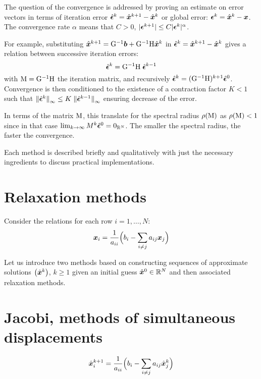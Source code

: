 \medskip
The question of the convergence is addressed by proving an estimate on error vectors in terms of iteration error $\hat{{\boldsymbol \epsilon}}^k = \hat{\boldsymbol x}^{k+1}-\hat{\boldsymbol x}^{k}$ or global error: ${\boldsymbol \epsilon}^k = \hat{\boldsymbol x}^{k}-{\boldsymbol x}$. The convergence rate $\alpha$ means that $C > 0$, $\lvert{\boldsymbol \epsilon}^{k+1}\rvert \leq C \lvert{\boldsymbol \epsilon}^{k}\rvert^\alpha$.

\medskip
For example, substituting $\hat{\boldsymbol x}^{k+1} = {\mathrm G}^{-1}{\boldsymbol b} + {\mathrm G}^{-1}{\mathrm H} \hat{\boldsymbol x}^{k}$ in $\hat{{\boldsymbol \epsilon}}^k = \hat{\boldsymbol x}^{k+1}-\hat{\boldsymbol x}^{k}$ gives a relation between successive iteration errors:
\[
\hat{{\boldsymbol \epsilon}}^{k} = {\mathrm G}^{-1}{\mathrm H}\;\hat{{\boldsymbol \epsilon}}^{k-1}
\]
with ${\mathrm M} = {\mathrm G}^{-1}{\mathrm H}$ the iteration matrix, and recursively $\hat{{\boldsymbol \epsilon}}^{k} = ({\mathrm G}^{-1}{\mathrm H})^{k+1}\hat{{\boldsymbol \epsilon}}^{0}$.
Convergence is then conditioned to the existence of a contraction factor $K < 1$ such that ${\lVert \hat{{\boldsymbol \epsilon}}^{k} \rVert}_{\infty} \leq K\;{\lVert \hat{{\boldsymbol \epsilon}}^{k-1} \rVert}_{\infty}$ ensuring decrease of the error.

\medskip
In terms of the matrix ${\mathrm M}$, this translate for the spectral radius $\rho({\mathrm M})$ as $\rho({\mathrm M}) < 1$ since in that case $\lim_{k\rightarrow\infty} M^k \hat{{\boldsymbol \epsilon}}^{0} = 0_{{\mathbb{R}^N}}$.
The smaller the spectral radius, the faster the convergence.

\medskip
Each method is described briefly and qualitatively with just the necessary ingredients to discuss practical implementations.

\section{Relaxation methods}

Consider the relations for each row $i=1,\dots,N$:
\begin{equation}
{\boldsymbol x}_i = \frac{1}{a_{ii}}\Bigl( b_i - \sum_{i\neq j} a_{ij} {\boldsymbol x}_j \Bigr)
\end{equation}

Let us introduce two methods based on constructing sequences of approximate solutions $\bigl(\hat{\boldsymbol x}^k\bigr)$, $k\geq1$ given an initial guess $\hat{\boldsymbol x}^0 \in {\mathbb{R}^N}$ and then associated relaxation methods.

\section{Jacobi, methods of simultaneous displacements}

\begin{equation}
\hat{\boldsymbol x}^{k+1}_i = \frac{1}{a_{ii}}\Bigl( b_i - \sum_{i\neq j} a_{ij} \hat{\boldsymbol x}^{k}_j \Bigr)
\end{equation}

